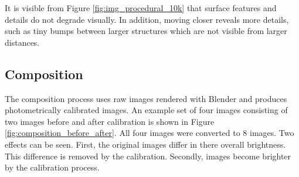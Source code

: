 It is visible from Figure \ref{fig:img_procedural_10k} that surface features and details do not degrade visually. In addition, moving closer reveals more details, such as tiny bumps between larger structures which are not visible from larger distances.


\subsection{Composition}
The composition process uses raw images rendered with Blender and produces photometrically calibrated images. An example set of four images consisting of two images before and after calibration is shown in Figure \ref{fig:composition_before_after}. All four images were converted to \SI{8}{\bit} images. Two effects can be seen. First, the original images differ in there overall brightness. This difference is removed by the calibration. Secondly, images become brighter by the calibration process. 

